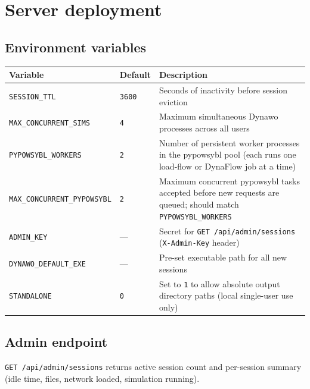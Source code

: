 \documentclass[a4paper,11pt]{article}
\newcommand{\code}[1]{\texttt{\small #1}}
\begin{document}
\section{Server deployment}
\label{sec:deploy}

\subsection{Environment variables}

\begin{center}
\begin{tabularx}{\linewidth}{llX}
\toprule
\textbf{Variable} & \textbf{Default} & \textbf{Description} \\
\midrule
\code{SESSION\_TTL}              & \code{3600} & Seconds of inactivity before
  session eviction \\
\code{MAX\_CONCURRENT\_SIMS}   & \code{4}    & Maximum simultaneous Dynawo
  processes across all users \\
\code{PYPOWSYBL\_WORKERS}      & \code{2}    & Number of persistent worker
  processes in the pypowsybl pool (each runs one load-flow or DynaFlow job at
  a time) \\
\code{MAX\_CONCURRENT\_PYPOWSYBL} & \code{2} & Maximum concurrent pypowsybl
  tasks accepted before new requests are queued; should match
  \code{PYPOWSYBL\_WORKERS} \\
\code{ADMIN\_KEY}              & ---         & Secret for
  \code{GET /api/admin/sessions} (\code{X-Admin-Key} header) \\
\code{DYNAWO\_DEFAULT\_EXE}    & ---         & Pre-set executable path for all
  new sessions \\
\code{STANDALONE}              & \code{0}    & Set to \code{1} to allow absolute
  output directory paths (local single-user use only) \\
\bottomrule
\end{tabularx}
\end{center}

\subsection{Admin endpoint}

\code{GET /api/admin/sessions} returns active session count and per-session
summary (idle time, files, network loaded, simulation running).

\end{document}
